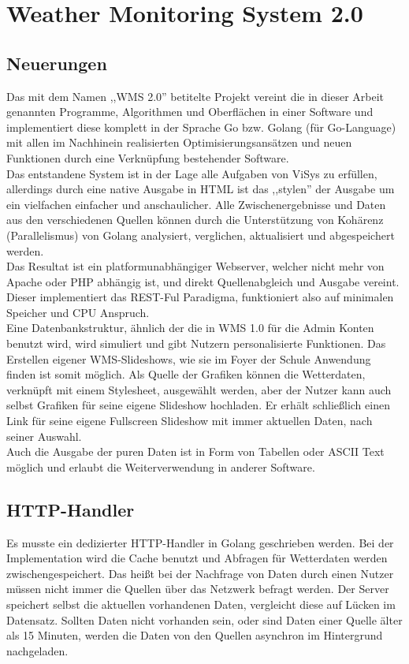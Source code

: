 \section{Weather Monitoring System 2.0}
\subsection{Neuerungen} %
Das mit dem Namen ,,WMS 2.0'' betitelte Projekt vereint die in dieser Arbeit genannten
Programme, Algorithmen und Oberflächen in einer Software und implementiert diese komplett
in der Sprache Go bzw. Golang (für Go-Language) mit allen im Nachhinein realisierten
Optimisierungsansätzen und neuen Funktionen durch eine Verknüpfung bestehender Software.\\
Das entstandene System ist in der Lage alle Aufgaben von ViSys zu erfüllen, allerdings durch
eine native Ausgabe in HTML ist das ,,stylen'' der Ausgabe um ein vielfachen einfacher und
anschaulicher. Alle Zwischenergebnisse und Daten aus den verschiedenen Quellen können durch
die Unterstützung von Kohärenz (Parallelismus) von Golang analysiert, verglichen, aktualisiert
und abgespeichert werden.\\
Das Resultat ist ein platformunabhängiger Webserver, welcher nicht mehr von Apache oder PHP
abhängig ist, und direkt Quellenabgleich und Ausgabe vereint. Dieser implementiert das REST-Ful
Paradigma, funktioniert also auf minimalen Speicher und CPU Anspruch. \\
Eine Datenbankstruktur, ähnlich der die in WMS 1.0 für die Admin Konten benutzt wird,
wird simuliert und gibt Nutzern personalisierte Funktionen.
Das Erstellen eigener WMS-Slideshows, wie sie im Foyer der Schule Anwendung finden
ist somit möglich. Als Quelle der Grafiken können die Wetterdaten, verknüpft mit einem
Stylesheet, ausgewählt werden, aber der Nutzer kann auch selbst Grafiken für seine eigene
Slideshow hochladen. Er erhält schließlich einen Link für seine eigene Fullscreen Slideshow
mit immer aktuellen Daten, nach seiner Auswahl.\\
Auch die Ausgabe der puren Daten ist in Form von Tabellen oder ASCII Text möglich und
erlaubt die Weiterverwendung in anderer Software.

\subsection{HTTP-Handler} %
Es musste ein dedizierter HTTP-Handler in Golang geschrieben werden. Bei der Implementation
wird die Cache benutzt und Abfragen für Wetterdaten werden zwischengespeichert. Das heißt bei der
Nachfrage von Daten durch einen Nutzer müssen nicht immer die Quellen über das Netzwerk befragt werden. 
Der Server speichert selbst die aktuellen vorhandenen Daten, 
vergleicht diese auf Lücken im Datensatz. 
Sollten Daten nicht vorhanden sein, oder sind Daten einer Quelle
älter als 15 Minuten, werden die Daten von den Quellen asynchron im Hintergrund nachgeladen.\\

